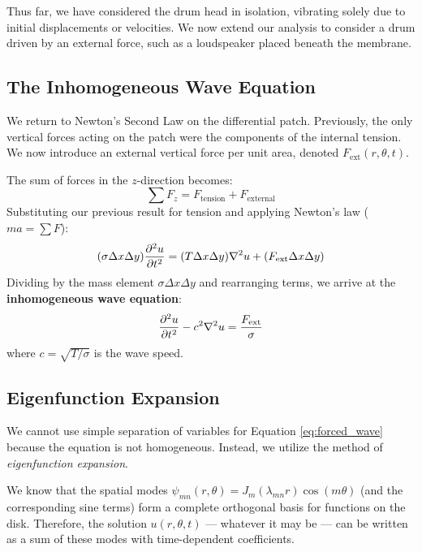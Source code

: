 \documentclass[11pt, letterpaper]{article}
\begin{document}
Thus far, we have considered the drum head in isolation, vibrating solely due to initial displacements or velocities. We now extend our analysis to consider a drum driven by an external force, such as a loudspeaker placed beneath the membrane.

\subsection{The Inhomogeneous Wave Equation}

We return to Newton's Second Law on the differential patch. Previously, the only vertical forces acting on the patch were the components of the internal tension. We now introduce an external vertical force per unit area, denoted $F_{\text{ext}}(r, \theta, t)$.

The sum of forces in the $z$-direction becomes:
\begin{equation}
    \sum F_z = F_{\text{tension}} + F_{\text{external}}
\end{equation}
Substituting our previous result for tension and applying Newton's law ($ma = \sum F$):
\begin{equation}
    (\sigma \Delta x \Delta y) \pdv[2]{u}{t} = (T \Delta x \Delta y) \nabla^2 u + (F_{\text{ext}} \Delta x \Delta y)
\end{equation}
Dividing by the mass element $\sigma \Delta x \Delta y$ and rearranging terms, we arrive at the \textbf{inhomogeneous wave equation}:
\begin{equation}
    \pdv[2]{u}{t} - c^2 \nabla^2 u = \frac{F_{\text{ext}}}{\sigma}
    \label{eq:forced_wave}
\end{equation}
where $c = \sqrt{T/\sigma}$ is the wave speed.

\subsection{Eigenfunction Expansion}

We cannot use simple separation of variables for Equation \ref{eq:forced_wave} because the equation is not homogeneous. Instead, we utilize the method of \textit{eigenfunction expansion}.

We know that the spatial modes $\psi_{mn}(r, \theta) = J_m(\lambda_{mn}r)\cos(m\theta)$ (and the corresponding sine terms) form a complete orthogonal basis for functions on the disk. Therefore, the solution $u(r, \theta, t)$ --- whatever it may be --- can be written as a sum of these modes with time-dependent coefficients.
\end{document}
